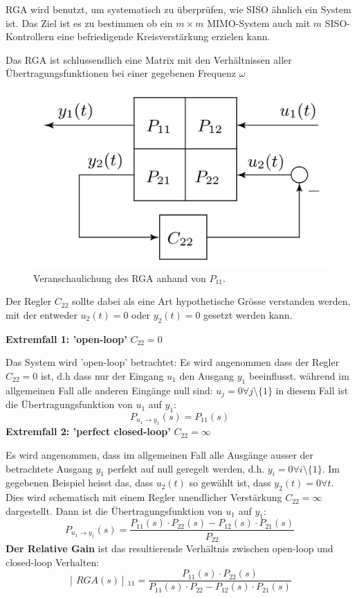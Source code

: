 RGA wird benutzt, um systematisch zu überprüfen, wie SISO ähnlich ein System ist. Das Ziel ist es zu bestimmen ob ein $m \times m$ MIMO-System auch mit $m$ SISO-Kontrollern eine befriedigende Kreisverstärkung erzielen kann. 

Das RGA ist schlussendlich eine Matrix mit den Verhältnissen aller Übertragungsfunktionen bei einer gegebenen Frequenz $\omega$ 

\begin{figure}[H]
    \centering
    \includegraphics[width = 0.4\linewidth]{images/06/RGA.jpg}
    \caption{Veranschaulichung des RGA anhand von $P_{11}$.}
\end{figure}
Der Regler $C_{22}$ sollte dabei als eine Art hypothetische Grösse verstanden werden, mit der entweder $u_{2}(t) = 0$ oder $y_2(t)=0$ gesetzt werden kann.

\textbf{Extremfall 1: 'open-loop'} $\boxed{C_{22} = 0}$

Das System wird 'open-loop' betrachtet: Es wird angenommen dass der Regler $C_{22} = 0$ ist, d.h dass nur der Eingang $u_1$ den Ausgang $y_1$ beeinflusst. während im allgemeinen Fall alle anderen Eingänge null sind: $u_j=0 \forall j \setminus \{1\}$
in diesem Fall ist die Übertragungsfunktion von $u_1$ auf $y_1$: 
\[P_{u_1\rightarrow y_1}(s) = P_{11}(s)\]
\textbf{Extremfall 2: 'perfect closed-loop'} $\boxed{C_{22}= \infty}$

Es wird angenommen, dass im allgemeinen Fall alle Ausgänge ausser der betrachtete Ausgang $y_1$ perfekt auf null geregelt werden, d.h. $y_i = 0 \forall i \setminus \{1\}$. Im gegebenen Beispiel heisst das, dass $u_2(t)$ so gewählt ist, dass $y_2(t) = 0 \forall t$. Dies wird schematisch mit einem Regler unendlicher Verstärkung $C_{22} = \infty$ dargestellt. Dann ist die Übertragungsfunktion von $u_1$ auf $y_1$:
\[P_{u_1 \rightarrow y_1}(s) = \frac{P_{11}(s)\cdot P_{22}(s) - P_{12}(s)\cdot P_{21}(s)}{P_{22}}\]
\textbf{Der Relative Gain} ist das resultierende Verhältnis zwischen open-loop und closed-loop Verhalten:\[[\,RGA(s)]\,_{11} = \frac{P_{11}(s)\cdot P_{22}(s)}{P_{11}(s)\cdot P_{22}-P_{12}(s)\cdot P_{21}(s)}\]

